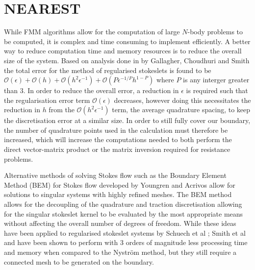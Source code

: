 \FloatBarrier
\section{NEAREST} \label{sec:NEAREST}
While FMM algorithms allow for the computation of large $N$-body problems to be computed, it is complex and time consuming to implement efficiently. A better way to reduce computation time and memory resources is to reduce the overall size of the system. Based on analysis done in by Gallagher, Choudhuri and Smith \cite{Gallagher2019SharpEquation} the total error for the method of regularised stokeslets is found to be $\mathcal{O}(\epsilon) + \mathcal{O}(h) + \mathcal{O}(h^2\epsilon^{-1}) + \mathcal{O}(P\epsilon^{-1/P} h^{1-P})$ where $P$ is any interger greater than 3. In order to reduce the overall error, a reduction in $\epsilon$ is required such that the regularisation error term $\mathcal{O}(\epsilon)$ decreases, however doing this necessitates the reduction in $h$ from the $\mathcal{O}(h^2\epsilon^{-1})$ term, the average quadrature spacing, to keep the discretisation error at a similar size. In order to still fully cover our boundary, the number of quadrature points used in the calculation must therefore be increased, which will increase the computations needed to both perform the direct vector-matrix product or the matrix inversion required for resistance problems. 

Alternative methods of solving Stokes flow such as the Boundary Element Method (BEM) for Stokes flow developed by Youngren and Acrivos \cite{Acrivos1975StokesSolution} allow for solutions to singular systems with highly refined meshes. The BEM method allows for the decoupling of the quadrature and traction discretisation allowing for the singular stokeslet kernel to be evaluated by the most appropriate means without affecting the overall number of degrees of freedom. While these ideas have been applied to regularised stokeslet systems by Schuech et al \cite{SchuechMotilePareto-optimal}; Smith et al \cite{Smith2009AFlow} and have been shown to perform with 3 orders of magnitude less processing time and memory when compared to the Nyström method, but they still require a connected mesh to be generated on the boundary. 

